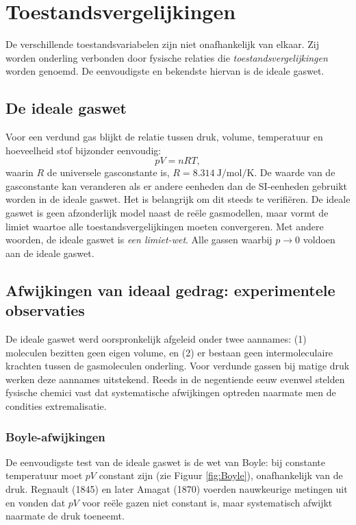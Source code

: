 \section{Toestandsvergelijkingen}

De verschillende toestandsvariabelen zijn niet onafhankelijk van elkaar. Zij worden onderling verbonden door fysische relaties die \emph{toestandsvergelijkingen} worden genoemd. De eenvoudigste en bekendste hiervan is de ideale gaswet.

\subsection{De ideale gaswet}

Voor een verdund gas blijkt de relatie tussen druk, volume, temperatuur en hoeveelheid stof bijzonder eenvoudig:
\begin{equation}
pV = nRT,
\end{equation}
waarin $R$ de universele gasconstante is, $R = \SI{8.314}{\joule\per\mole\per\kelvin}$. De waarde van de gasconstante kan veranderen als er andere eenheden dan de SI-eenheden gebruikt worden in de ideale gaswet. Het is belangrijk om dit steeds te verifiëren. De ideale gaswet is geen afzonderlijk model naast de re\"ele gasmodellen, maar vormt de limiet waartoe alle toestandsvergelijkingen moeten convergeren. Met andere woorden, de ideale gaswet is \emph{een limiet-wet}. Alle gassen waarbij $p \rightarrow 0$ voldoen aan de ideale gaswet. 

\subsection{Afwijkingen van ideaal gedrag: experimentele observaties}

De ideale gaswet werd oorspronkelijk afgeleid onder twee aannames: (1) moleculen bezitten geen eigen volume, en (2) er bestaan geen intermoleculaire krachten tussen de gasmoleculen onderling. Voor verdunde gassen bij matige druk werken deze aannames uitstekend. Reeds in de negentiende eeuw evenwel stelden fysische chemici vast dat systematische afwijkingen optreden naarmate men de condities extremalisatie.

\subsubsection{Boyle-afwijkingen}

De eenvoudigste test van de ideale gaswet is de wet van Boyle: bij constante temperatuur moet $pV$ constant zijn (zie Figuur \ref{fig:Boyle}), onafhankelijk van de druk. Regnault (1845) en later Amagat (1870) voerden nauwkeurige metingen uit en vonden dat $pV$ voor re\"ele gazen niet constant is, maar systematisch afwijkt naarmate de druk toeneemt.

